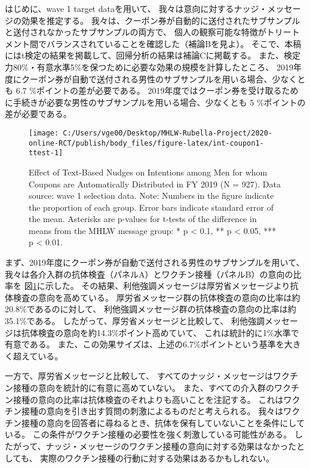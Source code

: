 \documentclass[
  11pt,
  a4paper,
]{article}
\begin{document}
はじめに、wave 1 target dataを用いて、
我々は意向に対するナッジ・メッセージの効果を推定する。
我々は、クーポン券が自動的に送付されたサブサンプルと送付されなかったサブサンプルの両方で、
個人の観察可能な特徴がトリートメント間でバランスされていることを確認した（補論Bを見よ）。
そこで、本稿にはt検定の結果を掲載して、回帰分析の結果は補論Cに掲載する。
また、検定力80\%・有意水準5\%を保つために必要な効果の規模を計算したところ、
2019年度にクーポン券が自動で送付される男性のサブサンプルを用いる場合、少なくとも
6.7
\%ポイントの差が必要である。
2019年度ではクーポン券を受け取るために手続きが必要な男性のサブサンプルを用いる場合、少なくとも
5
\%ポイントの差が必要である。

\begin{figure}[t]
\texttt{[image: C:/Users/vge00/Desktop/MHLW-Rubella-Project/2020-online-RCT/publish/body\_files/figure-latex/int-coupon1-ttest-1]} \caption{Effect of Text-Based Nudges on Intentions among Men for whom Coupons are Automatically Distributed in FY 2019 (N = 927). Data source: wave 1 selection data. Note: Numbers in the figure indicate the proportion of each group. Error bars indicate standard error of the mean. Asterisks are p-values for t-tests of the difference in means from the MHLW message group: * p < 0.1, ** p < 0.05, *** p < 0.01.}\label{fig:int-coupon1-ttest}
\end{figure}

まず、2019年度にクーポン券が自動で送付される男性のサブサンプルを用いて、
我々は各介入群の抗体検査（パネルA）とワクチン接種（パネルB）の意向の比率を
図\ref{fig:int-coupon1-ttest}に示した。
その結果、利他強調メッセージは厚労省メッセージより抗体検査の意向を高めている。
厚労省メッセージ群の抗体検査の意向の比率は約20.8\%であるのに対して、
利他強調メッセージ群の抗体検査の意向の比率は約35.1\%である。
したがって、厚労省メッセージと比較して、
利他強調メッセージは抗体検査の意向を約14.3\%ポイント高めていて、
これは統計的に1\%水準で有意である。
また、この効果サイズは、上述の6.7\%ポイントという基準を大きく超えている。

一方で、厚労省メッセージと比較して、
すべてのナッジ・メッセージはワクチン接種の意向を統計的に有意に高めていない。
また、すべての介入群のワクチン接種の意向の比率は抗体検査のそれよりも高いことを注記する。
これはワクチン接種の意向を引き出す質問の刺激によるものだと考えられる。
我々はワクチン接種の意向を回答者に尋ねるとき、抗体を保有していないことを条件にしている。
この条件がワクチン接種の必要性を強く刺激している可能性がある。
したがって、ナッジ・メッセージのワクチン接種の意向に対する効果はなかったとしても、
実際のワクチン接種の行動に対する効果はあるかもしれない。
\end{document}
